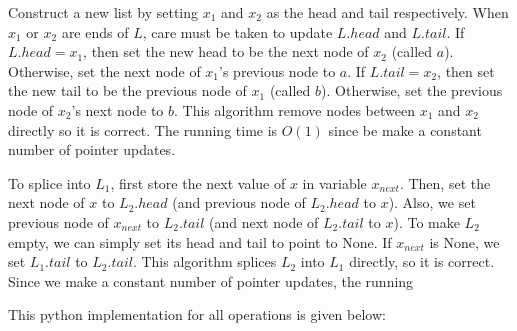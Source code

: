\documentclass[12pt,twoside]{article}
\begin{document}
\begin{problems}
\begin{problemparts}
\problempart %
Construct a new list by setting $x_1$ and $x_2$ as the head and tail respectively. When $x_1$ or $x_2$ are ends of $L$, care must be taken to update $L.head$ and $L.tail$. If $L.head = x_1$, then set the new head to be the next node of $x_2$ (called $a$). Otherwise, set the next node of $x_1$'s previous node to $a$. If $L.tail = x_2$, then set the new tail to be the previous node of $x_1$ (called $b$). Otherwise, set the previous node of $x_2$'s next node to $b$. This algorithm remove nodes between $x_1$ and $x_2$ directly so it is correct. The running time is $O(1)$ since be make a constant number of pointer updates. 

\problempart %
 To splice into $L_1$, first store the next value of $x$ in variable $x_{next}$. Then, set the next node of $x$ to $L_2.head$ (and previous node of $L_2.head$ to $x$). Also, we set previous node of $x_{next}$ to $L_2.tail$ (and next node of $L_2.tail$ to $x$). To make $L_2$ empty, we can simply set its head and tail to point to None. If $x_{next}$ is None, we set $L_1.tail$ to $L_2.tail$. This algorithm splices $L_2$ into $L_1$ directly, so it is correct. Since we make a constant number of pointer updates, the running
 
\problempart This python implementation for all operations is given below:


\end{problemparts}

\end{problems}
\end{document}
